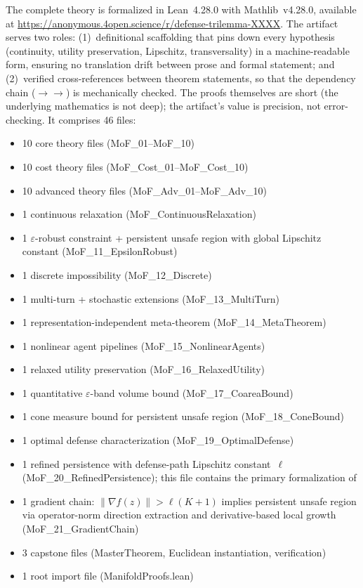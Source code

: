 \documentclass[11pt]{article}
\begin{document}
The complete theory is formalized in Lean~4.28.0 with Mathlib~v4.28.0,
available at
\url{https://anonymous.4open.science/r/defense-trilemma-XXXX}.
The artifact serves two roles: (1)~definitional scaffolding that
pins down every hypothesis (continuity, utility preservation,
Lipschitz, transversality) in a machine-readable form, ensuring
no translation drift between prose and formal statement; and
(2)~verified cross-references between theorem statements, so that
the dependency chain
($\to$$\to$)
is mechanically checked.
The proofs themselves are short (the underlying mathematics is not
deep); the artifact's value is precision, not error-checking.
It comprises 46 files:
\begin{itemize}[nosep]
  \item 10 core theory files (MoF\_01--MoF\_10)
  \item 10 cost theory files (MoF\_Cost\_01--MoF\_Cost\_10)
  \item 10 advanced theory files (MoF\_Adv\_01--MoF\_Adv\_10)
  \item 1 continuous relaxation (MoF\_ContinuousRelaxation)
  \item 1 $\varepsilon$-robust constraint + persistent unsafe region
    with global Lipschitz constant
    (MoF\_11\_EpsilonRobust)
  \item 1 discrete impossibility (MoF\_12\_Discrete)
  \item 1 multi-turn + stochastic extensions
    (MoF\_13\_MultiTurn)
  \item 1 representation-independent meta-theorem
    (MoF\_14\_MetaTheorem)
  \item 1 nonlinear agent pipelines (MoF\_15\_NonlinearAgents)
  \item 1 relaxed utility preservation (MoF\_16\_RelaxedUtility)
  \item 1 quantitative $\varepsilon$-band volume bound
    (MoF\_17\_CoareaBound)
  \item 1 cone measure bound for persistent unsafe region
    (MoF\_18\_ConeBound)
  \item 1 optimal defense characterization
    (MoF\_19\_OptimalDefense)
  \item 1 refined persistence with defense-path Lipschitz constant~$\ell$
    (MoF\_20\_RefinedPersistence); this file contains the primary
    formalization of 
  \item 1 gradient chain: $\|\nabla f(z)\| > \ell(K+1)$ implies
    persistent unsafe region via operator-norm direction extraction
    and derivative-based local growth
    (MoF\_21\_GradientChain)
  \item 3 capstone files (MasterTheorem, Euclidean instantiation,
    verification)
  \item 1 root import file (ManifoldProofs.lean)
\end{itemize}


\end{document}
